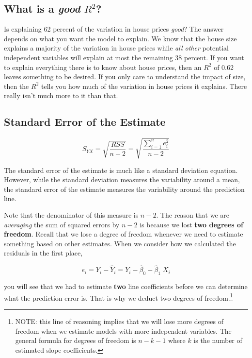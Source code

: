 \documentclass[
]{book}
\begin{document}
\subsection{\texorpdfstring{What is a \emph{good} \(R^2\)?}{What is a good R\^{}2?}}\label{what-is-a-good-r2}

Is explaining 62 percent of the variation in house prices \emph{good}? The answer depends on what you want the model to explain. We know that the house size explains a majority of the variation in house prices while \emph{all other} potential independent variables will explain at most the remaining 38 percent. If you want to explain everything there is to know about house prices, then an \(R^2\) of 0.62 leaves something to be desired. If you only care to understand the impact of size, then the \(R^2\) tells you how much of the variation in house prices it explains. There really isn't much more to it than that.

\subsection{Standard Error of the Estimate}\label{standard-error-of-the-estimate}

\[S_{YX} = \sqrt{\frac{RSS}{n-2}} = \sqrt{\frac{\sum^{n}_{i=1}e_i^2}{n-2}}\]

The standard error of the estimate is much like a standard deviation equation. However, while the standard deviation measures the variability around a mean, the standard error of the estimate measures the variability around the prediction line.

Note that the denominator of this measure is \(n-2\). The reason that we are \emph{averaging} the sum of squared errors by \(n-2\) is because we lost \textbf{two degrees of freedom}. Recall that we lose a degree of freedom whenever we need to estimate something based on other estimates. When we consider how we calculated the residuals in the first place,

\[ e_i = Y_i - \hat{Y}_i = Y_i - \hat{\beta}_0 - \hat{\beta}_1 \; X_i\]

you will see that we had to estimate \textbf{two} line coefficients before we can determine what the prediction error is. That is why we deduct two degrees of freedom.\footnote{NOTE: this line of reasoning implies that we will lose more degrees of freedom when we estimate models with more independent variables. The general formula for degrees of freedom is \(n-k-1\) where \(k\) is the number of estimated slope coefficients.}
\end{document}

